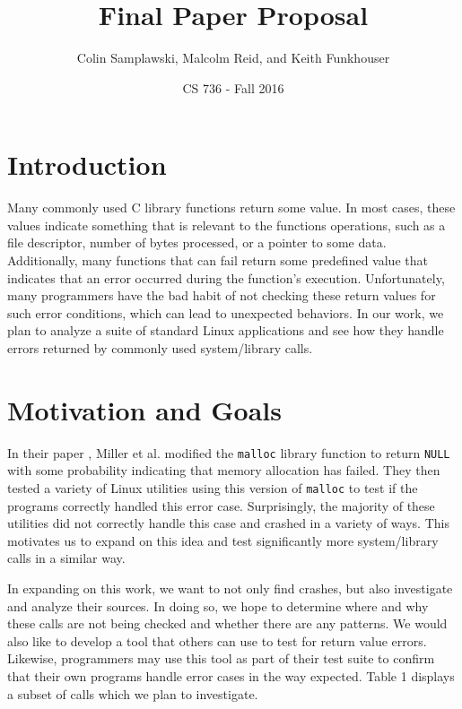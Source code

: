 \documentclass[10pt]{article}
\title{Final Paper Proposal}
\author{Colin Samplawski, Malcolm Reid, and Keith Funkhouser}
\date{CS 736 - Fall 2016}
\begin{document}
\maketitle
\setlength{\baselineskip}{18pt}
\section{Introduction}
Many commonly used C library functions return some value. In most cases, these values indicate something that is relevant to the  functions operations, such as a file descriptor, number of bytes processed, or a pointer to some data. Additionally, many functions that can fail return some predefined value that indicates that an error occurred during the function's execution. Unfortunately, many programmers have the bad habit of not checking these return values for such error conditions, which can lead to unexpected behaviors. In our work, we plan to analyze a suite of standard Linux applications and see how they handle errors returned by commonly used system/library calls.

\section{Motivation and Goals}
In their paper \cite{bart}, Miller et al. modified the \texttt{malloc} library function to return \texttt{NULL} with some probability indicating that memory allocation has failed. They then tested a variety of Linux utilities using this version of \texttt{malloc} to test if the programs correctly handled this error case. Surprisingly, the majority of these utilities did not correctly handle this case and crashed in a variety of ways. This motivates us to expand on this idea and test significantly more system/library calls in a similar way.

In expanding on this work, we want to not only find crashes, but also investigate and analyze their sources. In doing so, we hope to determine where and why these calls are not being checked and whether there are any patterns. We would also like to develop a tool that others can use to test for return value errors. Likewise, programmers may use this tool as part of their test suite to confirm that their own programs handle error cases in the way expected. Table 1 displays a subset of calls which we plan to investigate.
\end{document}
